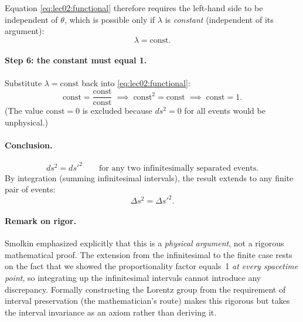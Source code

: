 Equation \eqref{eq:lec02:functional} therefore requires the left-hand
side to be independent of $\theta$, which is possible only if
$\lambda$ is \emph{constant} (independent of its argument):
\begin{equation}
  \lambda = \text{const.}
  \label{eq:lec02:const}
\end{equation}

\paragraph{Step 6: the constant must equal 1.}
Substitute $\lambda = \text{const}$ back into
\eqref{eq:lec02:functional}:
\begin{equation}
  \text{const} = \frac{\text{const}}{\text{const}}
  \;\implies\;
  \text{const}^2 = \text{const}
  \;\implies\;
  \text{const} = 1.
  \label{eq:lec02:const1}
\end{equation}
(The value $\text{const} = 0$ is excluded because $ds^2 = 0$ for all
events would be unphysical.)

\paragraph{Conclusion.}
\begin{equation}
  ds^2 = ds'^2
  \qquad \text{for any two infinitesimally separated events.}
  \label{eq:lec02:infinitesimal-invariance}
\end{equation}
By integration (summing infinitesimal intervals), the result
extends to any finite pair of events:
\begin{equation}
  \Delta s^2 = \Delta s'^2.
  \label{eq:lec02:finite-invariance}
\end{equation}

\paragraph{Remark on rigor.}
Smolkin emphasized explicitly that this is a \emph{physical argument},
not a rigorous mathematical proof.  The extension from the
infinitesimal to the finite case rests on the fact that we showed the
proportionality factor equals~1 \emph{at every spacetime point}, so
integrating up the infinitesimal intervals cannot introduce any
discrepancy.  Formally constructing the Lorentz group from the
requirement of interval preservation (the mathematician's route) makes
this rigorous but takes the interval invariance as an axiom rather
than deriving it.


